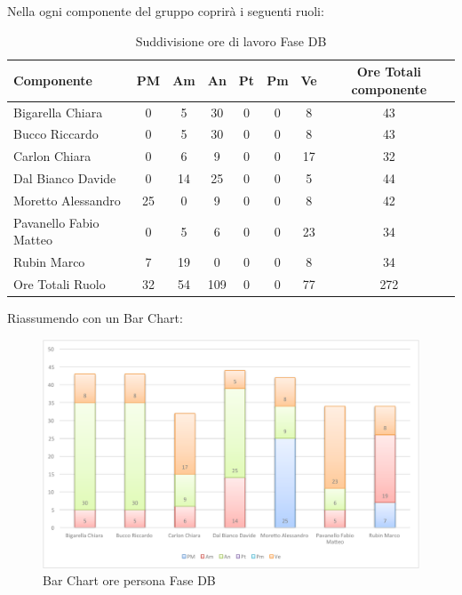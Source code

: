 				Nella  ogni componente del gruppo \groupname{} coprirà i seguenti ruoli:
				\begin{table}[H]
					\begin{center}
						\begin{tabular}{| l | c | c | c | c | c | c | c |}
							\hline
							Componente 					& PM	& Am 		& An 		& Pt 	& Pm 	& Ve 		& Ore Totali componente \\ \hline
							
							Bigarella Chiara 			& 0		& 5 		& 30 		& 0		& 0		& 8 		& 43 \\
							Bucco Riccardo 				& 0		& 5 		& 30 		& 0		& 0		& 8 		& 43 \\
							Carlon Chiara	 			& 0		& 6 		& 9 		& 0		& 0		& 17 		& 32 \\
							Dal Bianco Davide 			& 0		& 14 		& 25 		& 0		& 0		& 5 		& 44 \\
							Moretto Alessandro 			& 25 	& 0			& 9 		& 0		& 0		& 8 		& 42 \\
							Pavanello Fabio Matteo	 	& 0		& 5 		& 6 		& 0		& 0		& 23 		& 34 \\
							Rubin Marco					& 7 	& 19 		& 0			& 0		& 0		& 8 		& 34 \\ \hline \hline
							
							Ore Totali Ruolo 			& 32 	& 54 		& 109 		& 0		& 0		& 77 		& 272\\ \hline
						\end{tabular}
					\end{center}
					\caption{Suddivisione ore di lavoro Fase DB}
				\end{table}
				Riassumendo con un Bar Chart:
				\begin{figure}[H]\centering
					\includegraphics[width=\textwidth]{PianoDiProgetto/Pics/ChartOreFaseDB.pdf}
					\caption{Bar Chart ore persona Fase DB}
				\end{figure}
